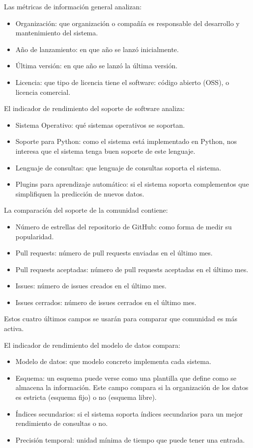 Las métricas de información general analizan:
\begin{itemize}
    \item Organización: que organización o compañía es responsable del desarrollo y mantenimiento del sistema.
    \item Año de lanzamiento: en que año se lanzó inicialmente.
    \item Última versión: en que año se lanzó la última versión.
    \item Licencia: que tipo de licencia tiene el software: código abierto (OSS), o licencia comercial.
\end{itemize}
El indicador de rendimiento del soporte de software analiza:
\begin{itemize}
    \item Sistema Operativo: qué sistemas operativos se soportan.
    \item Soporte para Python: como el sistema está implementado en Python, nos interesa que el sistema tenga
        buen soporte de este lenguaje.
    \item Lenguaje de consultas: que lenguaje de consultas soporta el sistema.
    \item Plugins para aprendizaje automático: si el sistema soporta complementos que simplifiquen la predicción de nuevos
        datos.
\end{itemize}
La comparación del soporte de la comunidad contiene:
\begin{itemize}
    \item Número de estrellas del repositorio de GitHub: como forma de medir su popularidad.
    \item Pull requests: número de pull requests enviadas en el último mes.
    \item Pull requests aceptadas: número de pull requests aceptadas en el último mes.
    \item Issues: número de issues creados en el último mes.
    \item Issues cerrados: número de issues cerrados en el último mes.
\end{itemize}
Estos cuatro últimos campos se usarán para comparar que comunidad es más activa.


El indicador de rendimiento del modelo de datos compara:
\begin{itemize}
    \item Modelo de datos: que modelo concreto implementa cada sistema.
    \item Esquema: un esquema puede verse como una plantilla que define como se almacena la información. Este campo
        compara si la organización de los datos es estricta (esquema fijo) o no (esquema libre).
    \item Índices secundarios: si el sistema soporta índices secundarios para un mejor rendimiento de consultas o no.
    \item Precisión temporal: unidad mínima de tiempo que puede tener una entrada.
\end{itemize}

